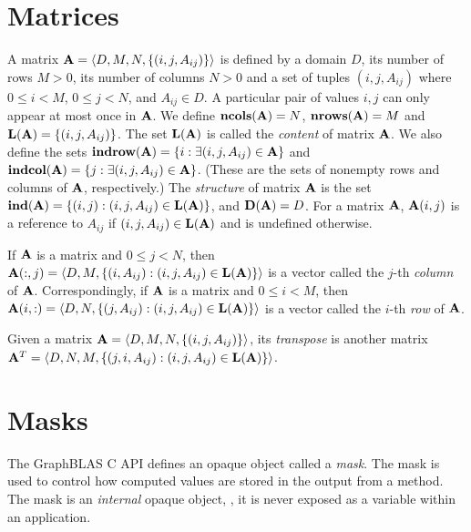 \section{Matrices}
\label{Sec:Matrices}

A matrix ${\bf A} = \langle D, M, N, \{ (i,j,A_{ij}) \} \rangle$ is
defined by a domain $D$, its number of rows $M>0$, its number of columns
$N>0$ and a set of tuples $(i,j,A_{ij})$ where $0 \leq i < M$, $0 \leq
j < N$, and $A_{ij} \in D$. A particular pair of values $i,j$ can only
appear at most once in ${\bf A}$. We define $\mathbf{ncols}({\bf A})
= N$,  $\mathbf{nrows}({\bf A}) = M$ and $\mathbf{L}({\bf A}) =
\{ (i,j,A_{ij}) \}$.  The set $\mathbf{L}({\bf A})$ is called the
\emph{content} of matrix ${\bf A}$.  We also define the sets
${\bf indrow({\bf A})} = \{ i : \exists (i,j,A_{ij}) \in
{\bf A} \}$ and ${\bf indcol({\bf A})} = \{ j : \exists
(i,j,A_{ij}) \in {\bf A} \}$.  (These are the sets of nonempty
rows and columns of ${\bf A}$, respectively.)  The \emph{structure}
of matrix ${\bf A}$ is the set $\mathbf{ind}({\bf A}) = \{ (i,j) :
(i,j,A_{ij}) \in \mathbf{L}({\bf A}) \}$, and $\mathbf{D}({\bf A}) = D$.
For a matrix ${\bf A}$, ${\bf A}(i,j)$ is a reference to $A_{ij}$
if $(i,j,A_{ij}) \in \mathbf{L}({\bf A})$ and is undefined otherwise.

If ${\bf A}$ is a matrix and $0 \leq j < N$, then ${\bf A}(:,j)
= \langle D, M, \{(i,A_{ij}) : (i,j,A_{ij}) \in \mathbf{L}({\bf A})
\} \rangle$ is a vector called the $j$-th \emph{column}
of ${\bf A}$. Correspondingly, if ${\bf A}$ is a matrix and
$0 \leq i < M$, then ${\bf A}(i,:) = \langle D, N, \{(j,A_{ij}) :
(i,j,A_{ij}) \in \mathbf{L}({\bf A}) \} \rangle$ is a vector called
the $i$-th \emph{row} of ${\bf A}$.

Given a matrix ${\bf A} = \langle D, M, N, \{ (i,j,A_{ij}) \} \rangle$,
its \emph{transpose} is another matrix ${\bf A}^T = \langle D, N, M, \{
(j,i,A_{ij}) : (i,j,A_{ij}) \in \mathbf{L}({\bf A}) \} \rangle$.

\section{Masks}
\label{Sec:Masks}

The GraphBLAS C API defines an opaque object called a \emph{mask}.  The mask
is used to control how computed values are stored in the output from a method. 
The mask is an \emph{internal} opaque object, \ie, it is never exposed as a variable
within an application. 

